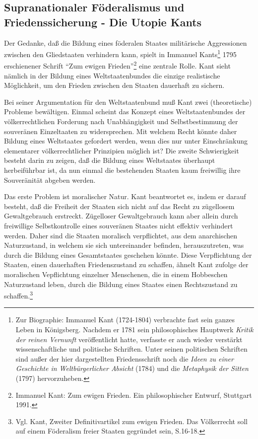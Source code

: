\documentclass[a4paper,12pt]{article}
\begin{document}
\subsection{Supranationaler Föderalismus und Friedenssicherung - Die Utopie
Kants} Der Gedanke, daß die Bildung eines föderalen Staates
militärische Aggressionen zwischen den Gliedstaaten verhindern
kann, spielt in Immanuel Kants\footnote{Zur Biographie: Immanuel
Kant (1724-1804) verbrachte fast sein ganzes Leben in
Königsberg. Nachdem er 1781 sein philosophisches Hauptwerk {\em
Kritik der reinen Vernunft} veröffentlicht hatte, verfasste er auch
wieder verstärkt wissenschaftliche und politische Schriften. Unter
seinen politischen Schriften sind außer der hier dargestellten
Friedensschrift noch die {\em Ideen zu einer Geschichte in
Weltbürgerlicher Absicht} (1784) und die {\em Metaphysik der
Sitten} (1797) hervorzuheben.} 1795 erschienener Schrift "`Zum
ewigen Frieden"'\footnote{Immanuel Kant\cite{kant}: Zum ewigen
Frieden. Ein philosophischer Entwurf, Stuttgart 1991.} eine
zentrale Rolle. Kant sieht nämlich in der Bildung eines
Weltstaatenbundes die einzige realistische Möglichkeit, um den
Frieden zwischen den Staaten dauerhaft zu sichern.

Bei seiner Argumentation für den Weltstaatenbund muß Kant zwei (theoretische)
Probleme bewältigen. Einmal scheint das Konzept eines Weltstaatenbundes der
völkerrechtlichen Forderung nach Unabhängigkeit und Selbstbestimmung der
souveränen Einzeltaaten zu widersprechen. Mit welchem Recht könnte daher
Bildung eines Weltstaates gefordert werden, wenn dies nur unter Einschränkung
elementarer völkerrechtlicher Prinzipien möglich ist? Die zweite Schwierigkeit
besteht darin zu zeigen, daß die Bildung eines Weltstaates überhaupt
herbeiführbar ist, da nun einmal die bestehenden Staaten kaum freiwillig ihre
Souveränität abgeben werden.

Das erste Problem ist moralischer Natur. Kant beantwortet es, indem er darauf
besteht, daß die Freiheit der Staaten sich nicht auf das Recht zu zügellosem
Gewaltgebrauch erstreckt. Zügelloser Gewaltgebrauch kann aber allein durch
freiwillige Selbstkontrolle eines souveränen Staates nicht effektiv verhindert
werden. Daher sind die Staaten moralisch verpflichtet, aus dem anarchischen
Naturzustand, in welchem sie sich untereinander befinden, herauszutreten, was
durch die Bildung eines Gesamtstaates geschehen könnte. Diese Verpflichtung
der Staaten, einen dauerhaften Friedenszustand zu schaffen, ähnelt Kant
zufolge der moralischen Vepflichtung einzelner Menschenen, die in einem
Hobbeschen Naturzustand leben, durch die Bildung eines Staates einen
Rechtszustand zu schaffen.\footnote{Vgl. Kant\cite{kant}, Zweiter
  Definitivartikel zum ewigen Frieden. Das Völkerrecht soll auf einem
  Föderalism freier Staaten gegründet sein, S.16-18.}
\end{document}
